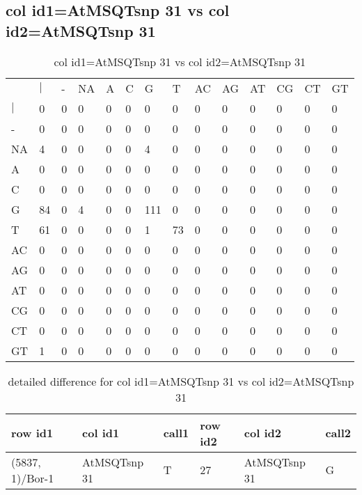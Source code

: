 \subsection{col id1=AtMSQTsnp 31 vs col id2=AtMSQTsnp 31}
\begin{center}
\begin{longtable}{|l|l|l|l|l|l|l|l|l|l|l|l|l|l|}
\caption{col id1=AtMSQTsnp 31 vs col id2=AtMSQTsnp 31} \label{table_dm848}\\
\hline
\\
\hline
&$|$&-&NA&A&C&G&T&AC&AG&AT&CG&CT&GT\\
$|$&0&0&0&0&0&0&0&0&0&0&0&0&0\\
-&0&0&0&0&0&0&0&0&0&0&0&0&0\\
NA&4&0&0&0&0&4&0&0&0&0&0&0&0\\
A&0&0&0&0&0&0&0&0&0&0&0&0&0\\
C&0&0&0&0&0&0&0&0&0&0&0&0&0\\
G&84&0&4&0&0&111&0&0&0&0&0&0&0\\
T&61&0&0&0&0&1&73&0&0&0&0&0&0\\
AC&0&0&0&0&0&0&0&0&0&0&0&0&0\\
AG&0&0&0&0&0&0&0&0&0&0&0&0&0\\
AT&0&0&0&0&0&0&0&0&0&0&0&0&0\\
CG&0&0&0&0&0&0&0&0&0&0&0&0&0\\
CT&0&0&0&0&0&0&0&0&0&0&0&0&0\\
GT&1&0&0&0&0&0&0&0&0&0&0&0&0\\
\hline
\end{longtable}
\end{center}

\begin{center}
\begin{longtable}{|l|l|l|l|l|l|}
\caption{detailed difference for col id1=AtMSQTsnp 31 vs col id2=AtMSQTsnp 31} \label{table_dm849}\\
\hline
row id1&col id1&call1&row id2&col id2&call2\\
\hline
(5837, 1)/Bor-1&AtMSQTsnp 31&T&27&AtMSQTsnp 31&G\\
\hline
\end{longtable}
\end{center}

